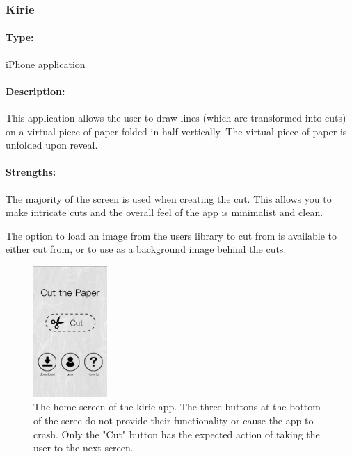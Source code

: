 \documentclass[11pt]{article}
\begin{document}
            
            \subsubsection{Kirie}
            
                \paragraph{Type:} iPhone application 

                \paragraph{Description:}
                This application allows the user to draw lines (which are transformed into cuts) on a virtual piece of paper folded in half vertically. The virtual piece of paper is unfolded upon reveal. 

                \paragraph{Strengths:}
                The majority of the screen is used when creating the cut. This allows you to make intricate cuts and the overall feel of the app is minimalist and clean. 
                
                The option to load an image from the users library to cut from is available to either cut from, or to use as a background image behind the cuts.
                
                 \begin{figure}
                    \centering
                    \includegraphics[width=0.25\textwidth]{Images/kirieMain.PNG}
                    \caption{The home screen of the kirie app. The three buttons at the bottom of the scree do not provide their functionality or cause the app to crash. Only the "Cut" button has the expected action of taking the user to the next screen.}
                    \label{fig:kirieMain}
                \end{figure}
                
\end{document}
